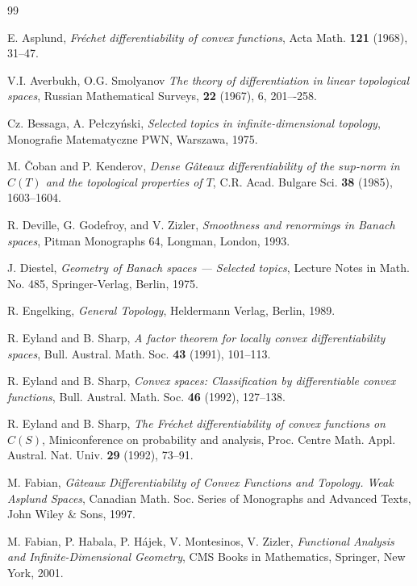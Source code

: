 \documentclass[12pt]{amsart}
\theoremstyle{plain}
\theoremstyle{definition}
\theoremstyle{remark}
\begin{document}
\begin{thebibliography}{99}

 E. Asplund,
\newblock \textit{Fr\'echet differentiability of convex functions}, Acta Math. \textbf{121} (1968), 31--47.

 V.I. Averbukh, O.G. Smolyanov
\newblock \textit{The theory of differentiation in linear topological spaces}, Russian
Mathematical Surveys, \textbf{22} (1967),  6, 201–-258.

  Cz. Bessaga, A. Pe{\l}czy\'nski,
\textit{Selected topics in infinite-dimensional topology}, Monografie Matematyczne PWN, Warszawa, 1975.

 M. \v Coban and P. Kenderov,
\newblock \textit{Dense G\^ ateaux differentiability of the $sup$-norm in $C(T)$
and the topological properties of $T$},
 C.R. Acad. Bulgare Sci. \textbf{38} (1985), 1603--1604.

 R. Deville, G. Godefroy, and V. Zizler,
\newblock \textit{Smoothness and renormings in Banach spaces},
 Pitman Monographs 64, Longman, London, 1993.

 J. Diestel, \textit{Geometry of Banach spaces --- Selected topics}, Lecture Notes in Math. No. 485, Springer-Verlag, Berlin, 1975.

 R. Engelking,
 \newblock \textit{General Topology}, Heldermann Verlag, Berlin, 1989.

 R. Eyland and B. Sharp,
\newblock \textit{A factor theorem for locally convex differentiability spaces},
 Bull. Austral. Math. Soc. \textbf{43} (1991), 101--113.

 R. Eyland and B. Sharp,
\newblock \textit{Convex spaces: Classification by differentiable convex functions},
 Bull. Austral. Math. Soc. \textbf{46} (1992), 127--138.

 R. Eyland and B. Sharp,
\newblock \textit{The Fr\'echet differentiability of convex functions on $C(S)$},
Miniconference on probability and analysis,
Proc. Centre Math. Appl. Austral. Nat. Univ. \textbf{29} (1992), 73--91.

 M. Fabian,
 \newblock \textit{G\^ ateaux Differentiability of Convex Functions and Topology. Weak Asplund Spaces},
 Canadian Math. Soc. Series of  Monographs and Advanced Texts, John Wiley $\&$ Sons, 1997.

  M. Fabian, P. Habala, P. H\'ajek, V. Montesinos, V. Zizler,
 \textit{Functional Analysis and Infinite-Dimensional Geometry}, CMS Books in Mathematics, Springer, New York, 2001.


\end{thebibliography}
\end{document}
